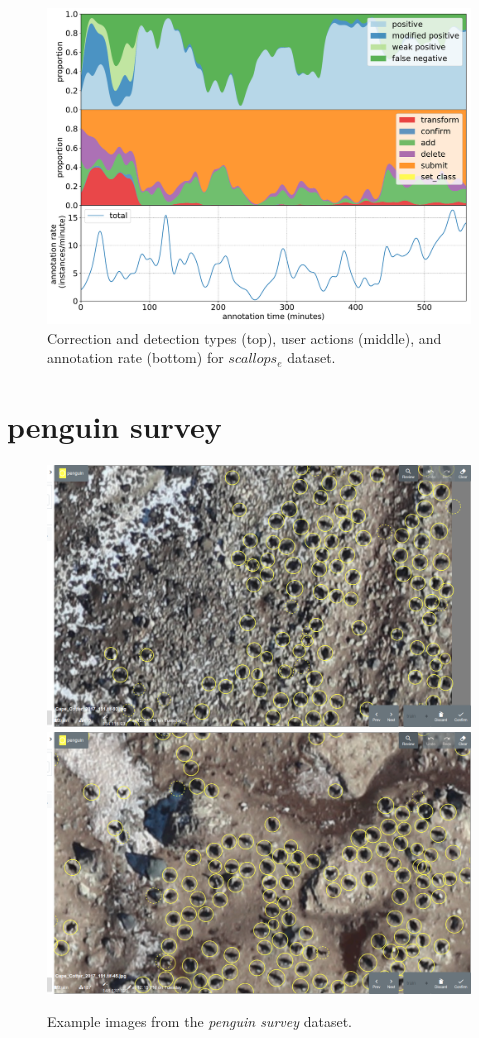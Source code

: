 \begin{figure}[!h]
\centering
\includegraphics[width=1.0\linewidth]{charts/action_annotations/scallops.pdf}
\caption{Correction and detection types (top), user actions (middle), and annotation rate (bottom) for $scallops_e$ dataset.}
\label{fig:scallop_annotation}
\end{figure}

\pagebreak
\section {penguin survey}
\label{sec:penguin_survey_details}


\begin{figure}[!h]
\centering
  \includegraphics[width=0.475\linewidth]{figures/annotation/screenshots/penguins_aerial.png}
  \hfill
  \includegraphics[width=0.475\linewidth]{figures/annotation/screenshots/penguins_aerial2.png}
  \caption{}
\caption{ Example images from the \emph{penguin survey} dataset.}
\label {fig:penguin_aerial_examples}
\end{figure}

